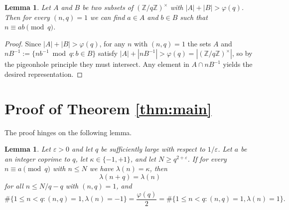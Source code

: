 \documentclass[11pt]{amsart}
\newtheorem{lemma}[theorem]{Lemma}
\begin{document}
\begin{lemma}\label{lem:comb}
Let $A$ and $B$ be two subsets of $(\mathbb{Z}/q\mathbb{Z})^{\times}$
with $|A|+|B|>\varphi(q)$.
Then for every $(n,q)=1$ we can find $a \in A$ and $b \in B$ such that
$n \equiv ab \pmod{q}$.
\end{lemma} 
\begin{proof}
Since $|A| + |B| > \varphi(q)$, for any $n$ with $(n,q)=1$
the sets $A$ and $nB^{-1} := \{n b^{-1} \bmod q : b \in B\}$
satisfy $|A| + |nB^{-1}| > \varphi(q) = |(\mathbb{Z}/q\mathbb{Z})^{\times}|$,
so by the pigeonhole principle they must intersect.
Any element in $A \cap nB^{-1}$ yields the desired representation.
\end{proof}

\section{Proof of Theorem \ref{thm:main}}
 
The proof hinges on the following lemma. 
\begin{lemma}\label{lem:periodicity}
Let $\varepsilon > 0$ and let $q$ be 
sufficiently large  with respect to $1/\varepsilon$.
Let $a$ be an integer coprime to $q$,
let $\kappa \in \{-1, +1\}$, and let $N \geq q^{2 + \varepsilon}$.
If for every $n \equiv a \pmod{q}$ with $n \leq N$ we have
$\lambda(n) = \kappa$, then
\[
\lambda(n + q) = \lambda(n)
\]
for all $n \leq N/q - q$ with $(n, q) = 1$, and
$$
\# \Big \{ 1 \leq n < q : (n,q)=1, \lambda(n) = -1 \Big \} = \frac{\varphi(q)}{2} = \# \Big \{ 1 \leq n < q : (n,q)=1, \lambda(n) = 1 \Big \}.
$$
\end{lemma}
\end{document}
